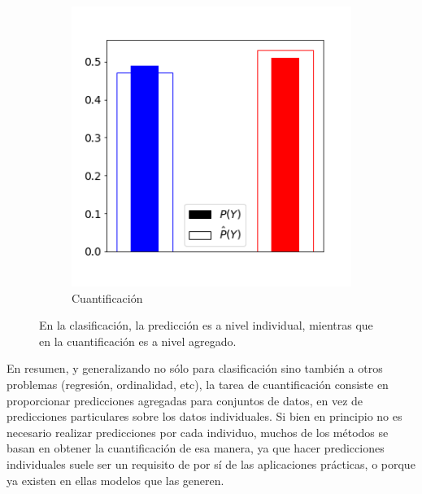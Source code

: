 \begin{figure}[h]
\begin{subfigure}[t]{0.4\textwidth}
        \includegraphics[width=\textwidth]{../plots_teoria/intro_barplot.png}
        \caption{Cuantificación}
    \end{subfigure}
    \caption{En la clasificación, la predicción es a nivel individual, mientras
    que en la cuantificación es a nivel agregado.}\label{fig:intro}
\end{figure}

En resumen, y generalizando no sólo para clasificación sino también a otros
problemas (regresión, ordinalidad, etc), la tarea de cuantificación consiste en
proporcionar predicciones agregadas para conjuntos de datos, en vez de
predicciones particulares sobre los datos individuales. Si bien en principio no
es necesario realizar predicciones por cada individuo, muchos de los métodos se
basan en obtener la cuantificación de esa manera, ya que hacer predicciones
individuales suele ser un requisito de por sí de las aplicaciones prácticas, o
porque ya existen en ellas modelos que las generen.

